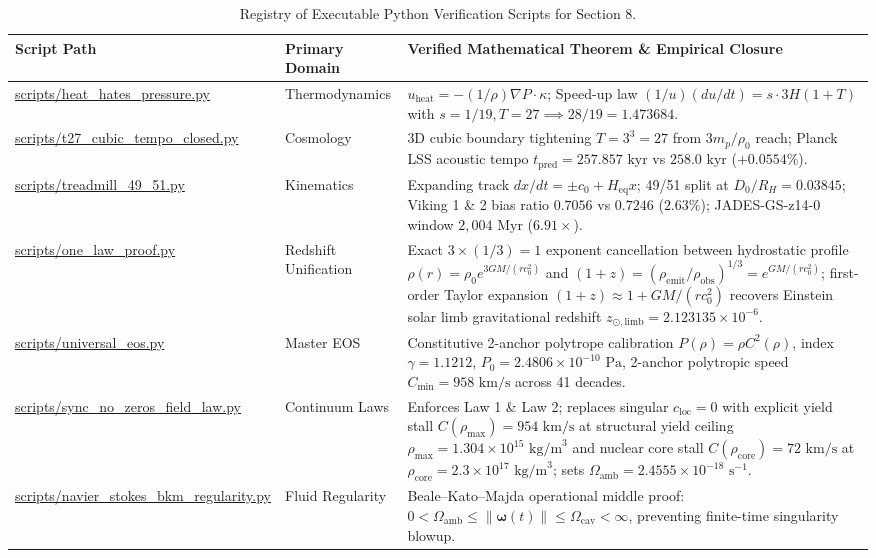 \documentclass[11pt,a4paper]{article}
\begin{document}
\begin{table}[htbp]
\centering
\scriptsize
\caption{Registry of Executable Python Verification Scripts for Section 8.}
\label{tab:scripts_registry}
\begin{tabularx}{\textwidth}{>{\raggedright\arraybackslash}p{4.3cm} l >{\raggedright\arraybackslash}X}
\toprule
\textbf{Script Path} & \textbf{Primary Domain} & \textbf{Verified Mathematical Theorem \& Empirical Closure} \\
\midrule
\url{scripts/heat_hates_pressure.py} & Thermodynamics & $u_{\text{heat}} = -(1/\rho)\nabla P \cdot \kappa$; Speed-up law $(1/u)(du/dt) = s \cdot 3H(1+T)$ with $s=1/19, T=27 \implies 28/19 = 1.473684$. \\
\url{scripts/t27_cubic_tempo_closed.py} & Cosmology & 3D cubic boundary tightening $T = 3^3 = 27$ from $3 m_p/\rho_0$ reach; Planck LSS acoustic tempo $t_{\text{pred}} = 257.857\text{ kyr}$ vs $258.0\text{ kyr}$ ($+0.0554\%$). \\
\url{scripts/treadmill_49_51.py} & Kinematics & Expanding track $dx/dt = \pm c_0 + H_{\text{eq}} x$; 49/51 split at $D_0/R_H = 0.03845$; Viking 1 \& 2 bias ratio $0.7056$ vs $0.7246$ ($2.63\%$); JADES-GS-z14-0 window $2,004\text{ Myr}$ ($6.91\times$). \\
\url{scripts/one_law_proof.py} & Redshift Unification & Exact $3 \times (1/3) = 1$ exponent cancellation between hydrostatic profile $\rho(r) = \rho_0 e^{3GM/(rc_0^2)}$ and $(1+z) = (\rho_{\text{emit}}/\rho_{\text{obs}})^{1/3} = e^{GM/(rc_0^2)}$; first-order Taylor expansion $(1+z) \approx 1 + GM/(rc_0^2)$ recovers Einstein solar limb gravitational redshift $z_{\odot,\text{limb}} = 2.123135 \times 10^{-6}$. \\
\url{scripts/universal_eos.py} & Master EOS & Constitutive 2-anchor polytrope calibration $P(\rho) = \rho C^2(\rho)$, index $\gamma = 1.1212$, $P_0 = 2.4806 \times 10^{-10}\text{ Pa}$, 2-anchor polytropic speed $C_{\min} = 958\text{ km/s}$ across 41 decades. \\
\url{scripts/sync_no_zeros_field_law.py} & Continuum Laws & Enforces Law 1 \& Law 2; replaces singular $c_{\text{loc}}=0$ with explicit yield stall $C(\rho_{\max}) = 954\text{ km/s}$ at structural yield ceiling $\rho_{\max} = 1.304 \times 10^{15}\text{ kg/m}^3$ and nuclear core stall $C(\rho_{\text{core}}) = 72\text{ km/s}$ at $\rho_{\text{core}} = 2.3 \times 10^{17}\text{ kg/m}^3$; sets $\Omega_{\text{amb}} = 2.4555 \times 10^{-18}\text{ s}^{-1}$. \\
\url{scripts/navier_stokes_bkm_regularity.py} & Fluid Regularity & Beale--Kato--Majda operational middle proof: $0 < \Omega_{\text{amb}} \le \|\boldsymbol{\omega}(t)\| \le \Omega_{\text{cav}} < \infty$, preventing finite-time singularity blowup. \\

\end{tabularx}
\end{table}
\end{document}
